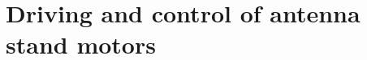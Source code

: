 \graphicspath{{figures/design/}}
\chapter{Driving and control of antenna stand motors}\label{ch:MechanicalModels}
%

%

%